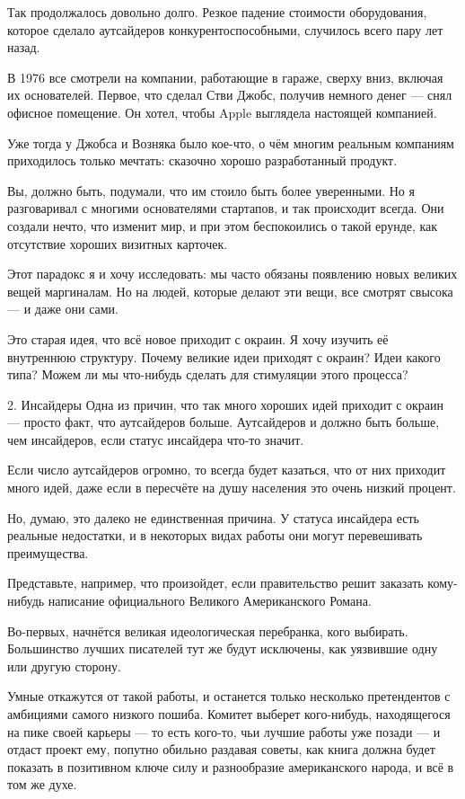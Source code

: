 \documentclass[ebook,12pt,oneside,openany]{memoir}
\begin{document}
Так продолжалось довольно долго. Резкое падение стоимости
оборудования, которое сделало аутсайдеров конкурентоспособными,
случилось всего пару лет назад.

В 1976 все смотрели на компании, работающие в гараже, сверху вниз,
включая их основателей. Первое, что сделал Стви Джобс, получив немного
денег — снял офисное помещение. Он хотел, чтобы Apple выглядела
настоящей компанией.

Уже тогда у Джобса и Возняка было кое-что, о чём многим реальным
компаниям приходилось только мечтать: сказочно хорошо разработанный
продукт.

Вы, должно быть, подумали, что им стоило быть более уверенными. Но я
разговаривал с многими основателями стартапов, и так происходит
всегда. Они создали нечто, что изменит мир, и при этом беспокоились о
такой ерунде, как отсутствие хороших визитных карточек.

Этот парадокс я и хочу исследовать: мы часто обязаны появлению новых
великих вещей маргиналам. Но на людей, которые делают эти вещи, все
смотрят свысока — и даже они сами.

Это старая идея, что всё новое приходит с окраин. Я хочу изучить её
внутреннюю структуру. Почему великие идеи приходят с окраин? Идеи
какого типа? Можем ли мы что-нибудь сделать для стимуляции этого
процесса?

2. Инсайдеры Одна из причин, что так много хороших идей приходит с
окраин — просто факт, что аутсайдеров больше. Аутсайдеров и должно
быть больше, чем инсайдеров, если статус инсайдера что-то значит.

Если число аутсайдеров огромно, то всегда будет казаться, что от них
приходит много идей, даже если в пересчёте на душу населения это очень
низкий процент.

Но, думаю, это далеко не единственная причина. У статуса инсайдера
есть реальные недостатки, и в некоторых видах работы они могут
перевешивать преимущества.

Представьте, например, что произойдет, если правительство решит
заказать кому-нибудь написание официального Великого Американского
Романа.

Во-первых, начнётся великая идеологическая перебранка, кого выбирать.
Большинство лучших писателей тут же будут исключены, как уязвившие
одну или другую сторону.

Умные откажутся от такой работы, и останется только несколько
претендентов с амбициями самого низкого пошиба. Комитет выберет
кого-нибудь, находящегося на пике своей карьеры — то есть кого-то, чьи
лучшие работы уже позади — и отдаст проект ему, попутно обильно
раздавая советы, как книга должна будет показать в позитивном ключе
силу и разнообразие американского народа, и всё в том же духе.
\end{document}
